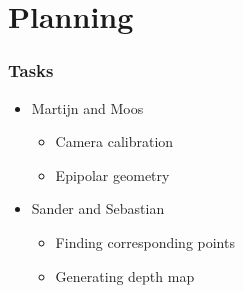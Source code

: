 \documentclass{beamer}
\begin{document}

\section{Planning}

\frame
{
  \frametitle{Tasks}
  \begin{itemize}
    \item Martijn and Moos
    \begin{itemize}
      \item Camera calibration
      \item Epipolar geometry
    \end{itemize}
    \item Sander and Sebastian
    \begin{itemize}
      \item Finding corresponding points
      \item Generating depth map
    \end{itemize}
  \end{itemize}
}
\end{document}
